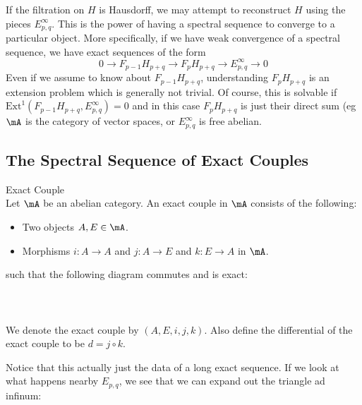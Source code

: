 \documentclass[a4paper]{article}
\begin{document}
If the filtration on $H$ is Hausdorff, we may attempt to reconstruct $H$ using the pieces $E_{p,q}^\infty$. This is the power of having a spectral sequence to converge to a particular object. More specifically, if we have weak convergence of a spectral sequence, we have exact sequences of the form $$0\to F_{p-1}H_{p+q}\to F_pH_{p+q}\to E_{p,q}^\infty\to 0$$ Even if we assume to know about $F_{p-1}H_{p+q}$, understanding $F_pH_{p+q}$ is an extension problem which is generally not trivial. Of course, this is solvable if $\text{Ext}^1(F_{p-1}H_{p+q},E_{p,q}^\infty)=0$ and in this case $F_pH_{p+q}$ is just their direct sum (eg $\mA$ is the category of vector spaces, or $E_{p,q}^\infty$ is free abelian. 

\subsection{The Spectral Sequence of Exact Couples}
\begin{defn}{Exact Couple}{}\\
Let $\mA$ be an abelian category. An exact couple in $\mA$ consists of the following: 
\begin{itemize}
\item Two objects $A,E\in\mA$. 
\item Morphisms $i:A\to A$ and $j:A\to E$ and $k:E\to A$ in $\mA$. 
\end{itemize}
such that the following diagram commutes and is exact: \\~\\
\\~\\
We denote the exact couple by $(A,E,i,j,k)$. Also define the differential of the exact couple to be $d=j\circ k$. 
\end{defn}

Notice that this actually just the data of a long exact sequence. If we look at what happens nearby $E_{p,q}$, we see that we can expand out the triangle ad infinum: \\~\\
\\~\\
\end{document}
